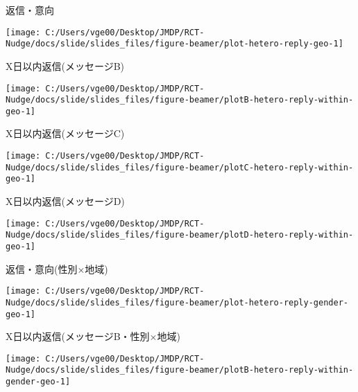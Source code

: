 \documentclass[
      aspectratio=169,
        12pt,
    ]{beamer}
\begin{document}
\begin{frame}{返信・意向}
\protect\hypertarget{ux8fd4ux4fe1ux610fux5411}{}
\begin{center}\texttt{[image: C:/Users/vge00/Desktop/JMDP/RCT-Nudge/docs/slide/slides\_files/figure-beamer/plot-hetero-reply-geo-1]} \end{center}
\end{frame}

\begin{frame}{X日以内返信(メッセージB)}
\protect\hypertarget{xux65e5ux4ee5ux5185ux8fd4ux4fe1ux30e1ux30c3ux30bbux30fcux30b8b}{}
\begin{center}\texttt{[image: C:/Users/vge00/Desktop/JMDP/RCT-Nudge/docs/slide/slides\_files/figure-beamer/plotB-hetero-reply-within-geo-1]} \end{center}
\end{frame}

\begin{frame}{X日以内返信(メッセージC)}
\protect\hypertarget{xux65e5ux4ee5ux5185ux8fd4ux4fe1ux30e1ux30c3ux30bbux30fcux30b8c}{}
\begin{center}\texttt{[image: C:/Users/vge00/Desktop/JMDP/RCT-Nudge/docs/slide/slides\_files/figure-beamer/plotC-hetero-reply-within-geo-1]} \end{center}
\end{frame}

\begin{frame}{X日以内返信(メッセージD)}
\protect\hypertarget{xux65e5ux4ee5ux5185ux8fd4ux4fe1ux30e1ux30c3ux30bbux30fcux30b8d}{}
\begin{center}\texttt{[image: C:/Users/vge00/Desktop/JMDP/RCT-Nudge/docs/slide/slides\_files/figure-beamer/plotD-hetero-reply-within-geo-1]} \end{center}
\end{frame}

\begin{frame}{返信・意向(性別×地域)}
\protect\hypertarget{ux8fd4ux4fe1ux610fux5411ux6027ux5225ux5730ux57df}{}
\begin{center}\texttt{[image: C:/Users/vge00/Desktop/JMDP/RCT-Nudge/docs/slide/slides\_files/figure-beamer/plot-hetero-reply-gender-geo-1]} \end{center}
\end{frame}

\begin{frame}{X日以内返信(メッセージB・性別×地域)}
\protect\hypertarget{xux65e5ux4ee5ux5185ux8fd4ux4fe1ux30e1ux30c3ux30bbux30fcux30b8bux6027ux5225ux5730ux57df}{}
\begin{center}\texttt{[image: C:/Users/vge00/Desktop/JMDP/RCT-Nudge/docs/slide/slides\_files/figure-beamer/plotB-hetero-reply-within-gender-geo-1]} \end{center}
\end{frame}
\end{document}

